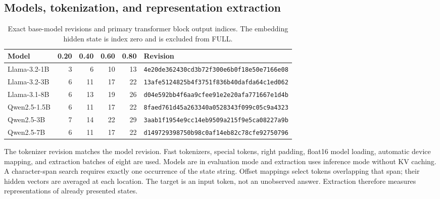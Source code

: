 \subsection{Models, tokenization, and representation extraction}
\begin{table}[h]
\centering
\caption{Exact base-model revisions and primary transformer block output indices. The embedding hidden state is index zero and is excluded from FULL.}
\label{tab:models}
\small
\begin{tabular}{lrrrrl}
\toprule
Model & 0.20 & 0.40 & 0.60 & 0.80 & Revision \\
\midrule
Llama-3.2-1B & 3&6&10&13 & \texttt{4e20de362430cd3b72f300e6b0f18e50e7166e08}\\
Llama-3.2-3B & 6&11&17&22 & \texttt{13afe5124825b4f3751f836b40dafda64c1ed062}\\
Llama-3.1-8B & 6&13&19&26 & \texttt{d04e592bb4f6aa9cfee91e2e20afa771667e1d4b}\\
Qwen2.5-1.5B & 6&11&17&22 & \texttt{8faed761d45a263340a0528343f099c05c9a4323}\\
Qwen2.5-3B & 7&14&22&29 & \texttt{3aab1f1954e9cc14eb9509a215f9e5ca08227a9b}\\
Qwen2.5-7B & 6&11&17&22 & \texttt{d149729398750b98c0af14eb82c78cfe92750796}\\
\bottomrule
\end{tabular}
\end{table}
The tokenizer revision matches the model revision. Fast tokenizers, special tokens, right padding, float16 model loading, automatic device mapping, and extraction batches of eight are used. Models are in evaluation mode and extraction uses inference mode without KV caching. A character-span search requires exactly one occurrence of the state string. Offset mappings select tokens overlapping that span; their hidden vectors are averaged at each location. The target is an input token, not an unobserved answer. Extraction therefore measures representations of already presented states.

